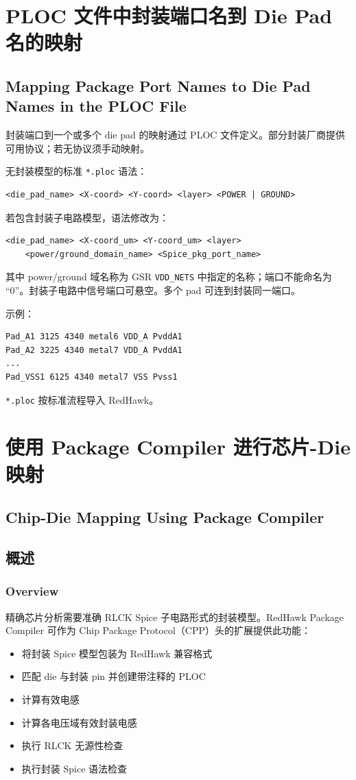 \section{PLOC 文件中封装端口名到 Die Pad 名的映射}
\subsection*{Mapping Package Port Names to Die Pad Names in the PLOC File}

封装端口到一个或多个 die pad 的映射通过 PLOC 文件定义。部分封装厂商提供可用协议；若无协议须手动映射。

无封装模型的标准 \texttt{*.ploc} 语法：
\begin{lstlisting}
<die_pad_name> <X-coord> <Y-coord> <layer> <POWER | GROUND>
\end{lstlisting}

若包含封装子电路模型，语法修改为：
\begin{lstlisting}
<die_pad_name> <X-coord_um> <Y-coord_um> <layer>
    <power/ground_domain_name> <Spice_pkg_port_name>
\end{lstlisting}
其中 power/ground 域名称为 GSR \texttt{VDD\_NETS} 中指定的名称；端口不能命名为 ``0''。封装子电路中信号端口可悬空。多个 pad 可连到封装同一端口。

示例：
\begin{lstlisting}
Pad_A1 3125 4340 metal6 VDD_A PvddA1
Pad_A2 3225 4340 metal7 VDD_A PvddA1
...
Pad_VSS1 6125 4340 metal7 VSS Pvss1
\end{lstlisting}

\texttt{*.ploc} 按标准流程导入 RedHawk。

\section{使用 Package Compiler 进行芯片-Die 映射}
\subsection*{Chip-Die Mapping Using Package Compiler}

\subsection{概述}
\subsubsection*{Overview}

精确芯片分析需要准确 RLCK Spice 子电路形式的封装模型。RedHawk Package Compiler 可作为 Chip Package Protocol（CPP）头的扩展提供此功能：
\begin{itemize}
  \item 将封装 Spice 模型包装为 RedHawk 兼容格式
  \item 匹配 die 与封装 pin 并创建带注释的 PLOC
  \item 计算有效电感
  \item 计算各电压域有效封装电感
  \item 执行 RLCK 无源性检查
  \item 执行封装 Spice 语法检查
\end{itemize}

